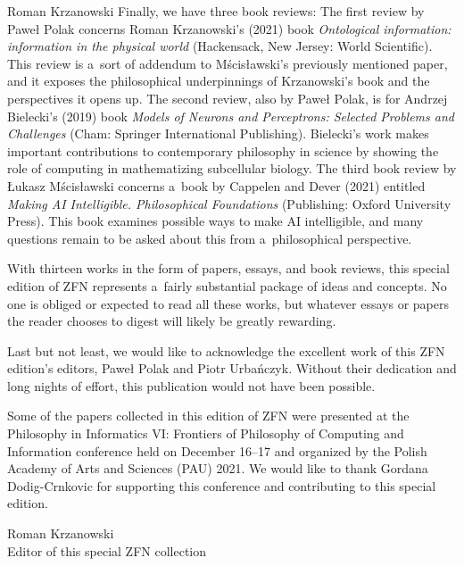 \begin{editorialeng}{Roman Krzanowski}
Finally, we have three book reviews: The first review by Paweł Polak concerns Roman Krzanowski's (2021) book \textit{Ontological information: information in the physical world} (Hackensack, New Jersey: World Scientific). This review is a~sort of addendum to Mścisławski's previously mentioned paper, and it exposes the philosophical underpinnings of Krzanowski's book and the perspectives it opens up. The second review, also by Paweł Polak, is for Andrzej Bielecki's (2019) book \textit{Models of Neurons and Perceptrons: Selected Problems and Challenges} (Cham: Springer International Publishing). Bielecki's work makes important contributions to contemporary philosophy in science by showing the role of computing in mathematizing subcellular biology. The third book review by Łukasz Mścisławski concerns a~book by Cappelen and Dever (2021) entitled \textit{Making AI Intelligible. Philosophical Foundations} (Publishing: Oxford University Press). This book examines possible ways to make AI intelligible, and many questions remain to be asked about this from a~philosophical perspective.

With thirteen works in the form of papers, essays, and book reviews, this special edition of ZFN represents a~fairly substantial package of ideas and concepts. No one is obliged or expected to read all these works, but whatever essays or papers the reader chooses to digest will likely be greatly rewarding.

Last but not least, we would like to acknowledge the excellent work of this ZFN edition's editors, Paweł Polak and Piotr Urbańczyk. Without their dedication and long nights of effort, this publication would not have been possible.

Some of the papers collected in this edition of ZFN were presented at the Philosophy in Informatics VI: Frontiers of Philosophy of Computing and Information conference held on December 16–17 and organized by the Polish Academy of Arts and Sciences (PAU) 2021. We would like to thank Gordana Dodig-Crnkovic for supporting this conference and contributing to this special edition.

\begin{flushright}
Roman Krzanowski\\
Editor of this special ZFN collection
\end{flushright}

\end{editorialeng}
